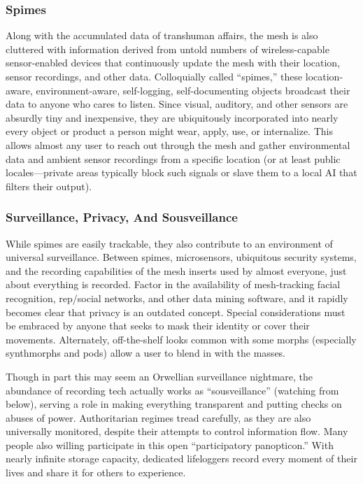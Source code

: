 \subsubsection{Spimes}

Along with the accumulated data of transhuman 
affairs, the mesh is also cluttered with information 
derived from untold numbers of wireless-capable sensor-enabled
devices that continuously update the mesh
with their location, sensor recordings, and other data. 
Colloquially called ``spimes,'' these location-aware, 
environment-aware, self-logging, self-documenting 
objects broadcast their data to anyone who cares to 
listen. Since visual, auditory, and other sensors are 
absurdly tiny and inexpensive, they are ubiquitously 
incorporated into nearly every object or product a 
person might wear, apply, use, or internalize. This 
allows almost any user to reach out through the mesh 
and gather environmental data and ambient sensor 
recordings from a specific location (or at least public 
locales—private areas typically block such signals or 
slave them to a local AI that filters their output).

\subsubsection{Surveillance, Privacy, And Sousveillance}

While spimes are easily trackable, they also contribute
to an environment of universal surveillance.
Between spimes, microsensors, ubiquitous security 
systems, and the recording capabilities of the mesh 
inserts used by almost everyone, just about everything
is recorded. Factor in the availability of mesh-tracking
facial recognition, rep/social networks, and
other data mining software, and it rapidly becomes 
clear that privacy is an outdated concept. Special 
considerations must be embraced by anyone that 
seeks to mask their identity or cover their movements. 
Alternately, off-the-shelf looks common with some 
morphs (especially synthmorphs and pods) allow a 
user to blend in with the masses.

Though in part this may seem an Orwellian surveillance
nightmare, the abundance of recording
tech actually works as ``sousveillance'' (watching 
from below), serving a role in making everything 
transparent and putting checks on abuses of power. 
Authoritarian regimes tread carefully, as they are also 
universally monitored, despite their attempts to control
information flow. Many people also willing participate
in this open ``participatory panopticon.'' With
nearly infinite storage capacity, dedicated lifeloggers 
record every moment of their lives and share it for 
others to experience.

